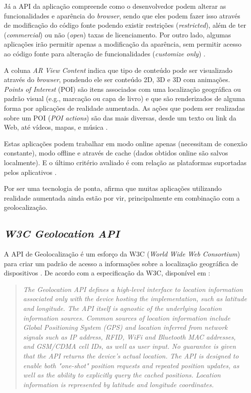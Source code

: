 \documentclass[diss]{template/setrem}
\begin{document}
Já a API da aplicação compreende como o desenvolvedor podem alterar as funcionalidades e aparência do \emph{browser}, sendo que eles podem fazer isso através de modificação do código fonte podendo existir restrições (\emph{restricted}), além de ter (\emph{commercial}) ou não (\emph{open}) taxas de licenciamento. Por outro lado, algumas aplicações irão permitir apenas a modificação da aparência, sem permitir acesso ao código fonte para alteração de funcionalidades (\emph{customize only}) \citep{Butchart2012}.

A coluna \emph{AR View Content} indica que tipo de conteúdo pode ser visualizado através do \emph{browser}, pondendo ele ser conteúdo 2D, 3D e 3D com animações. \emph{Points of Interest} (POI) são itens associados com uma localização geográfica ou padrão visual (e.g., marcação ou capa de livro) e que são renderizados de alguma forma por aplicações de realidade aumentada. As ações que podem ser realizadas sobre um POI (\emph{POI actions}) são das mais diversas, desde um texto ou link da Web, até vídeos, mapas, e música \citep{Butchart2012}.

Estas aplicações podem trabalhar em modo online apenas (necessitam de conexão constante), modo offline e através de cache (dados obtidos online são salvos localmente). E o último critério avaliado é com relação as plataformas suportadas pelos aplicativos \citep{Butchart2012}.

Por ser uma tecnologia de ponta, \citet{Holdener2011} afirma que muitas aplicações utilizando realidade aumentada ainda estão por vir, principalmente em combinação com a geolocalização.

\subsection{\textit{W3C Geolocation API}}
\label{subsec:w3cgeolocation}
A API de Geolocalização é um esforço da W3C (\emph{World Wide Web Consortium}) para criar um padrão de acesso a informações sobre a localização geográfica de dispositivos \citep{Holdener2011}. De acordo com a especificação da W3C, disponível em \citet[2. Introduction]{Popescu2009}:

\begin{quotation}\emph{
The Geolocation API defines a high-level interface to location information associated only with the device hosting the implementation, such as latitude and longitude. The API itself is agnostic of the underlying location information sources. Common sources of location information include Global Positioning System (GPS) and location inferred from network signals such as IP address, RFID, WiFi and Bluetooth MAC addresses, and GSM/CDMA cell IDs, as well as user input. No guarantee is given that the API returns the device's actual location.
The API is designed to enable both "one-shot" position requests and repeated position updates, as well as the ability to explicitly query the cached positions. Location information is represented by latitude and longitude coordinates.
}\end{quotation}
\end{document}
